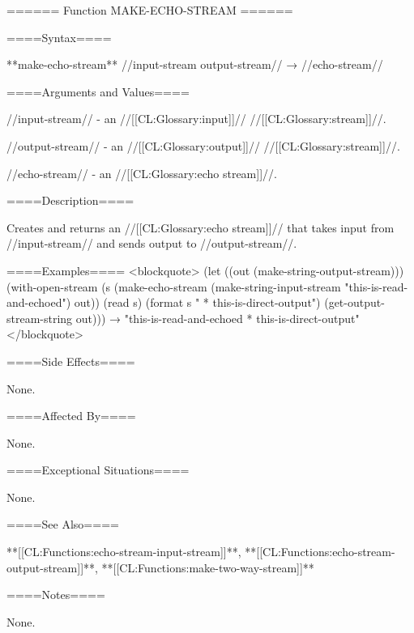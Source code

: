 ====== Function MAKE-ECHO-STREAM ======

====Syntax====

**make-echo-stream** //input-stream output-stream// → //echo-stream//

====Arguments and Values====

//input-stream// - an //[[CL:Glossary:input]]// //[[CL:Glossary:stream]]//.

//output-stream// - an //[[CL:Glossary:output]]// //[[CL:Glossary:stream]]//.

//echo-stream// - an //[[CL:Glossary:echo stream]]//.

====Description====

Creates and returns an //[[CL:Glossary:echo stream]]// that takes input from //input-stream// and sends output to //output-stream//.

====Examples==== <blockquote> (let ((out (make-string-output-stream))) (with-open-stream (s (make-echo-stream (make-string-input-stream "this-is-read-and-echoed") out)) (read s) (format s " * this-is-direct-output") (get-output-stream-string out))) → "this-is-read-and-echoed * this-is-direct-output" </blockquote>

====Side Effects====

None.

====Affected By====

None.

====Exceptional Situations====

None.

====See Also====

**[[CL:Functions:echo-stream-input-stream]]**, **[[CL:Functions:echo-stream-output-stream]]**, **[[CL:Functions:make-two-way-stream]]**

====Notes====

None.

